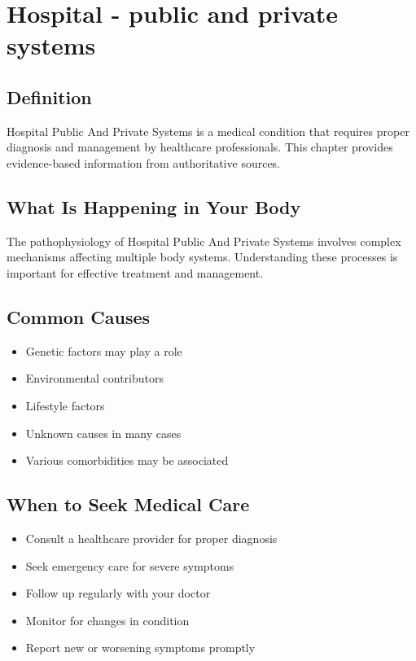 
\chapter{Hospital - public and private systems}

\section*{Definition}
Hospital Public And Private Systems is a medical condition that requires proper diagnosis and management by healthcare professionals. This chapter provides evidence-based information from authoritative sources.

\section*{What Is Happening in Your Body}
The pathophysiology of Hospital Public And Private Systems involves complex mechanisms affecting multiple body systems. Understanding these processes is important for effective treatment and management.

\section*{Common Causes}
\begin{itemize}
  \item Genetic factors may play a role
  \item Environmental contributors
  \item Lifestyle factors
  \item Unknown causes in many cases
  \item Various comorbidities may be associated
\end{itemize}

\section*{When to Seek Medical Care}
\begin{itemize}
  \item Consult a healthcare provider for proper diagnosis
  \item Seek emergency care for severe symptoms
  \item Follow up regularly with your doctor
  \item Monitor for changes in condition
  \item Report new or worsening symptoms promptly
\end{itemize}

